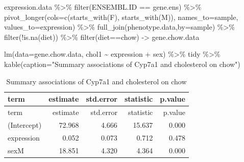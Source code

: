 \documentclass[
]{article}
\newenvironment{Shaded}{\begin{snugshade}}{\end{snugshade}}
\newcommand{\AttributeTok}[1]{\textcolor[rgb]{0.77,0.63,0.00}{#1}}
\newcommand{\FunctionTok}[1]{\textcolor[rgb]{0.00,0.00,0.00}{#1}}
\newcommand{\NormalTok}[1]{#1}
\newcommand{\OtherTok}[1]{\textcolor[rgb]{0.56,0.35,0.01}{#1}}
\newcommand{\SpecialCharTok}[1]{\textcolor[rgb]{0.00,0.00,0.00}{#1}}
\newcommand{\StringTok}[1]{\textcolor[rgb]{0.31,0.60,0.02}{#1}}
\begin{document}
\begin{Shaded}
\begin{Highlighting}[]
\NormalTok{expression.data }\SpecialCharTok{\%\textgreater{}\%}
  \FunctionTok{filter}\NormalTok{(ENSEMBL.ID }\SpecialCharTok{==}\NormalTok{ gene.ens) }\SpecialCharTok{\%\textgreater{}\%}
  \FunctionTok{pivot\_longer}\NormalTok{(}\AttributeTok{cols=}\FunctionTok{c}\NormalTok{(}\FunctionTok{starts\_with}\NormalTok{(}\StringTok{\textquotesingle{}F\textquotesingle{}}\NormalTok{),}
                      \FunctionTok{starts\_with}\NormalTok{(}\StringTok{\textquotesingle{}M\textquotesingle{}}\NormalTok{)),}
               \AttributeTok{names\_to=}\StringTok{\textquotesingle{}sample\textquotesingle{}}\NormalTok{,}
               \AttributeTok{values\_to=}\StringTok{\textquotesingle{}expression\textquotesingle{}}\NormalTok{) }\SpecialCharTok{\%\textgreater{}\%}
  \FunctionTok{full\_join}\NormalTok{(phenotype.data,}\AttributeTok{by=}\StringTok{\textquotesingle{}sample\textquotesingle{}}\NormalTok{) }\SpecialCharTok{\%\textgreater{}\%}
  \FunctionTok{filter}\NormalTok{(}\SpecialCharTok{!}\FunctionTok{is.na}\NormalTok{(diet)) }\SpecialCharTok{\%\textgreater{}\%}
  \FunctionTok{filter}\NormalTok{(diet}\SpecialCharTok{==}\StringTok{\textquotesingle{}chow\textquotesingle{}}\NormalTok{) }\OtherTok{{-}\textgreater{}}\NormalTok{ gene.chow.data}

\FunctionTok{lm}\NormalTok{(}\AttributeTok{data=}\NormalTok{gene.chow.data, chol1 }\SpecialCharTok{\textasciitilde{}}\NormalTok{ expression }\SpecialCharTok{+}\NormalTok{ sex) }\SpecialCharTok{\%\textgreater{}\%}
\NormalTok{  tidy }\SpecialCharTok{\%\textgreater{}\%}
  \FunctionTok{kable}\NormalTok{(}\AttributeTok{caption=}\StringTok{"Summary associations of Cyp7a1 and cholesterol on chow"}\NormalTok{)}
\end{Highlighting}
\end{Shaded}

\begin{longtable}[]{@{}lrrrr@{}}
\caption{Summary associations of Cyp7a1 and cholesterol on
chow}\tabularnewline
\toprule()
term & estimate & std.error & statistic & p.value \\
\midrule()
\endfirsthead
\toprule()
term & estimate & std.error & statistic & p.value \\
\midrule()
\endhead
(Intercept) & 72.968 & 4.666 & 15.637 & 0.000 \\
expression & 0.052 & 0.073 & 0.712 & 0.478 \\
sexM & 18.851 & 4.320 & 4.364 & 0.000 \\
\bottomrule()
\end{longtable}
\end{document}
